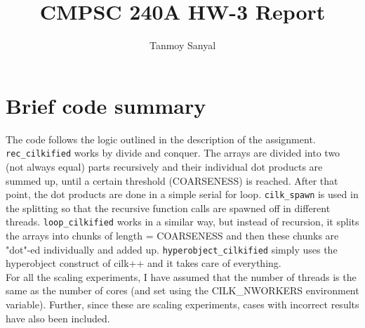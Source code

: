 \documentclass[12pt,letterpaper]{article}
\author{Tanmoy Sanyal}
\title{CMPSC 240A HW-3 Report}
\begin{document}
\maketitle

\section*{Brief code summary}
\noindent The code follows the logic outlined in the description of the assignment. \texttt{rec\_cilkified} works by divide and conquer. The arrays are divided into two (not always equal) parts recursively and their individual dot products are summed up, until a certain threshold (COARSENESS) is reached. After that point, the dot products are done in a simple serial for loop. \texttt{cilk\_spawn} is used in the splitting so that the recursive function calls are spawned off in different threads. \texttt{loop\_cilkified} works in a similar way, but instead of recursion, it splits the arrays into chunks of length = COARSENESS and then these chunks are "dot"-ed individually and added up. \texttt{hyperobject\_cilkified} simply uses the hyperobject construct of cilk++ and it takes care of everything.\\

\noindent For all the scaling experiments, I have assumed that the number of threads is the same as the number of cores (and set using the CILK\_NWORKERS environment variable). Further, since these are scaling experiments, cases with incorrect results have also been included. 
\end{document}
